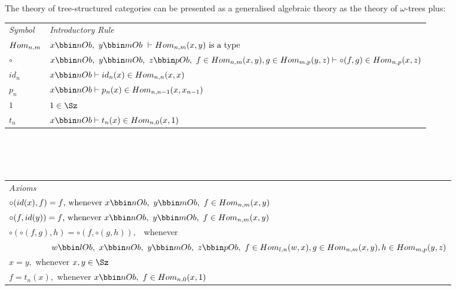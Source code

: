 \documentclass[10pt,a4paper]{scrartcl}
\begin{document}
\noindent The theory of tree-structured categories can be presented as a generalised algebraic theory as 
the theory of  $\omega$-trees plus: \\
\vspace{0.03cm} 
\begin{tabular}{>{\itshape}l l}
Symbol & \itshape{Introductory Rule} \\[0.1cm]
$Hom_{n,m} $ &$\ofObi{x}{n} ,\  \ofObi{y}{m} \ \tstyle \isT{\HomijBar{n}{m}{x}{y}} $\\ [0.25cm]
$\circ$ & $\ofObi{x}{n}, \  \ofObi{y}{m}, \ \ofObi{z}{p}, \ \ofHomij{f}{n}{m}{x}{y},\ofHomij{g}{m}{p}{y}{z} \tstyle \ofHomij{\circ(f,g)}{n}{p}{x}{z}$ \\ [0.25cm]
$id_n   $   & $ \ofObi{x}{n} \tstyle \ofHomij{id_n(x)}{n}{n}{x}{x} $\\ [0.25cm]
$p_n   $   & $ \ofObi{x}{n} \tstyle \ofHomij{p_n(x)}{n}{n-1}{x}{x_{n-1}} $\\ [0.25cm]
$1     $   & $\ofT{1}{\Sz} $\\         [0.25cm]
$t_n   $   & $ \ofObi{x}{n} \tstyle t_n(x) \in \Homij{n}{0}(x,1)$\\ [0.25cm]
\end{tabular} \\
\vspace{.1cm}  \\
\vspace{.03cm} \\
\begin{tabular}{l}
\itshape{Axioms} \\

$\circ(id(x),f)=f \mbox{,  whenever\ } \ofObi{x}{n} ,\  \ofObi{y}{m} , \ \ofHomij{f}{n}{m}{x}{y}  $\\ [0.25cm]
$\circ(f,id(y))=f \mbox{,  whenever\ } \ofObi{x}{n} ,\  \ofObi{y}{m} , \ \ofHomij{f}{n}{m}{x}{y}  $\\ [0.25cm]
$ \circ(\circ(f,g),h) = \circ(f,\circ(g,h)),$ \ whenever \\ [0.2cm]
$ \ \ \ \ \ \ \ \ \ \ \ \ \ \ \ 
\ofObi{w}{l} , \ \ofObi{x}{n} , \ \ofObi{y}{m} , \ \ofObi{z}{p}, \ 
 \ofHomij{f}{l}{n}{w}{x}, \ofHomij{g}{n}{m}{x}{y}, \ofHomij{h}{m}{p}{y}{z}$ \\ [0.25cm]
$x = y, $ whenever $x,y \in \Sz $ \\ [0.25cm]
$f = t_n(x),  $ whenever $ \ofObi{x}{n}, \ f \in \Homij{n}{0}(x,1)$\\ [0.25cm]
\end{tabular}  \\
\vspace{.05cm}  \\
\end{document}
